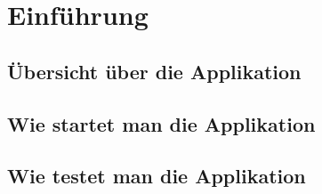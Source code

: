 \chapter{Einführung}
\section{Übersicht über die Applikation}
\section{Wie startet man die Applikation}
\section{Wie testet man die Applikation}
